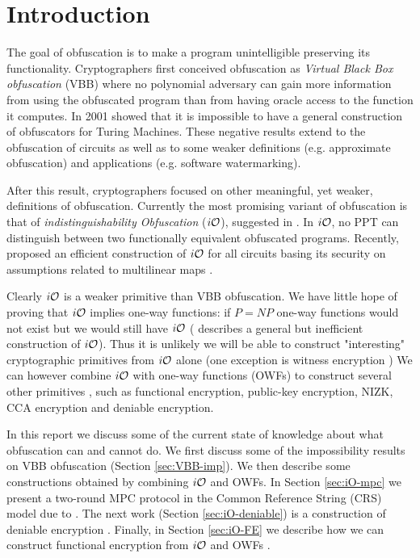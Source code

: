 
\section{Introduction}
The goal of obfuscation is to make a program unintelligible preserving its functionality.
Cryptographers first conceived obfuscation as \emph{Virtual Black Box obfuscation} (VBB) where
no polynomial adversary can gain more information from using the obfuscated program than from having
oracle access to the function it computes. In 2001 \cite{VBB-imp} showed that it is impossible to have a general construction of obfuscators for Turing Machines. These negative results extend to the obfuscation of circuits as well as to some weaker definitions (e.g. approximate obfuscation) and applications (e.g. software watermarking).

After this result, cryptographers focused on other meaningful, yet weaker, definitions of
obfuscation. Currently the most promising variant of obfuscation is that of \emph{indistinguishability Obfuscation} ($i\mathcal{O}$), suggested in \cite{VBB-imp}. In $i\mathcal{O}$, no PPT can distinguish between two functionally equivalent obfuscated programs. Recently, \cite{garg2013candidate} proposed an efficient construction of $i\mathcal{O}$ for all circuits basing its security on assumptions related to multilinear maps \cite{garg2013candidatemulti}.

Clearly $i\mathcal{O}$ is a weaker primitive than VBB obfuscation. We have little hope of proving that $i\mathcal{O}$ implies one-way functions: if $P = NP$ one-way functions would not exist but we would still have $i\mathcal{O}$ (\cite{VBB-imp} describes a general but inefficient construction of $i\mathcal{O}$). 
Thus it is unlikely we will be able to construct "interesting" cryptographic primitives from
$i\mathcal{O}$ alone (one exception is witness encryption \cite{}) %
We can however combine $i\mathcal{O}$ with one-way functions (OWFs) to construct several other primitives \cite{}, such as functional encryption, public-key encryption, NIZK, CCA encryption and deniable encryption. %


In this report we discuss some of the current state of knowledge about what obfuscation can and cannot do.
We first discuss some of the impossibility results on VBB obfuscation (Section \ref{sec:VBB-imp}). %
We then describe some constructions obtained by combining $i\mathcal{O}$ and OWFs. In Section \ref{sec:iO-mpc} we present a two-round MPC protocol in the Common Reference String (CRS) model due to \cite{iO-mpc}. The next work (Section \ref{sec:iO-deniable}) is a construction of deniable encryption \cite{iO-deniable}. Finally, in Section \ref{sec:iO-FE} we describe how we can construct functional encryption \cite{} %
from $i\mathcal{O}$ and OWFs \cite{iO-FE}.


